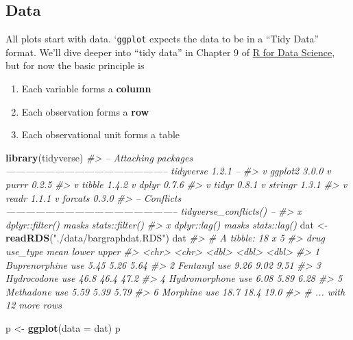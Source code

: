 \documentclass[]{book}
\newenvironment{Shaded}{\begin{snugshade}}{\end{snugshade}}
\newcommand{\KeywordTok}[1]{\textcolor[rgb]{0.13,0.29,0.53}{\textbf{#1}}}
\newcommand{\DataTypeTok}[1]{\textcolor[rgb]{0.13,0.29,0.53}{#1}}
\newcommand{\StringTok}[1]{\textcolor[rgb]{0.31,0.60,0.02}{#1}}
\newcommand{\CommentTok}[1]{\textcolor[rgb]{0.56,0.35,0.01}{\textit{#1}}}
\newcommand{\NormalTok}[1]{#1}
\providecommand{\tightlist}{%
  \setlength{\itemsep}{0pt}\setlength{\parskip}{0pt}}
\theoremstyle{definition}
\theoremstyle{definition}
\theoremstyle{definition}
\theoremstyle{remark}
\begin{document}
\subsection{Data}\label{data}

All plots start with data. `\texttt{ggplot} expects the data to be in a
``Tidy Data'' format. We'll dive deeper into ``tidy data'' in Chapter 9
of \href{}{R for Data Science}, but for now the basic principle is

\begin{enumerate}
\def\labelenumi{\arabic{enumi}.}
\tightlist
\item
  Each variable forms a \textbf{column}
\item
  Each observation forms a \textbf{row}
\item
  Each observational unit forms a table
\end{enumerate}

\begin{Shaded}
\begin{Highlighting}[]
\KeywordTok{library}\NormalTok{(tidyverse)}
\CommentTok{#> -- Attaching packages -------------------------------------------------- tidyverse 1.2.1 --}
\CommentTok{#> v ggplot2 3.0.0     v purrr   0.2.5}
\CommentTok{#> v tibble  1.4.2     v dplyr   0.7.6}
\CommentTok{#> v tidyr   0.8.1     v stringr 1.3.1}
\CommentTok{#> v readr   1.1.1     v forcats 0.3.0}
\CommentTok{#> -- Conflicts ----------------------------------------------------- tidyverse_conflicts() --}
\CommentTok{#> x dplyr::filter() masks stats::filter()}
\CommentTok{#> x dplyr::lag()    masks stats::lag()}
\NormalTok{dat <-}\StringTok{ }\KeywordTok{readRDS}\NormalTok{(}\StringTok{"./data/bargraphdat.RDS"}\NormalTok{)}
\NormalTok{dat}
\CommentTok{#> # A tibble: 18 x 5}
\CommentTok{#>   drug          use_type  mean lower upper}
\CommentTok{#>   <chr>         <chr>    <dbl> <dbl> <dbl>}
\CommentTok{#> 1 Buprenorphine use       5.45  5.26  5.64}
\CommentTok{#> 2 Fentanyl      use       9.26  9.02  9.51}
\CommentTok{#> 3 Hydrocodone   use      46.8  46.4  47.2 }
\CommentTok{#> 4 Hydromorphone use       6.08  5.89  6.28}
\CommentTok{#> 5 Methadone     use       5.59  5.39  5.79}
\CommentTok{#> 6 Morphine      use      18.7  18.4  19.0 }
\CommentTok{#> # ... with 12 more rows}
\end{Highlighting}
\end{Shaded}

\begin{Shaded}
\begin{Highlighting}[]
\NormalTok{p <-}\StringTok{ }\KeywordTok{ggplot}\NormalTok{(}\DataTypeTok{data =}\NormalTok{ dat)}
\NormalTok{p}
\end{Highlighting}
\end{Shaded}
\end{document}

